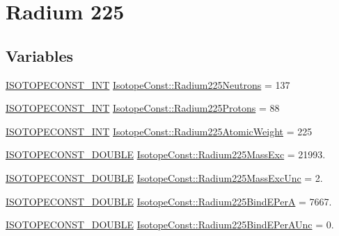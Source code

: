 \hypertarget{group___isotope_const-_radium-_ra225}{}\section{Radium 225}
\label{group___isotope_const-_radium-_ra225}
\subsection*{Variables}
\begin{DoxyCompactItemize}
\item 
\mbox{\hyperlink{group___isotope_const-_macros_ga5f18360b3e99483a35c32d789e62621c}{I\+S\+O\+T\+O\+P\+E\+C\+O\+N\+S\+T\+\_\+\+I\+NT}} \mbox{\hyperlink{group___isotope_const-_radium-_ra225_gac2692ce0cbf1dfe123369ef953519fb7}{Isotope\+Const\+::\+Radium225\+Neutrons}} = 137
\item 
\mbox{\hyperlink{group___isotope_const-_macros_ga5f18360b3e99483a35c32d789e62621c}{I\+S\+O\+T\+O\+P\+E\+C\+O\+N\+S\+T\+\_\+\+I\+NT}} \mbox{\hyperlink{group___isotope_const-_radium-_ra225_ga2947655642e26c28b35f58be93a990cc}{Isotope\+Const\+::\+Radium225\+Protons}} = 88
\item 
\mbox{\hyperlink{group___isotope_const-_macros_ga5f18360b3e99483a35c32d789e62621c}{I\+S\+O\+T\+O\+P\+E\+C\+O\+N\+S\+T\+\_\+\+I\+NT}} \mbox{\hyperlink{group___isotope_const-_radium-_ra225_gaeafa217f0c04afd10711a221abee6bfe}{Isotope\+Const\+::\+Radium225\+Atomic\+Weight}} = 225
\item 
\mbox{\hyperlink{group___isotope_const-_macros_ga8f45a7272ce02c0b4c65c44636ed719a}{I\+S\+O\+T\+O\+P\+E\+C\+O\+N\+S\+T\+\_\+\+D\+O\+U\+B\+LE}} \mbox{\hyperlink{group___isotope_const-_radium-_ra225_gaf5c7bdb0575e4c892258792d58313612}{Isotope\+Const\+::\+Radium225\+Mass\+Exc}} = 21993.
\item 
\mbox{\hyperlink{group___isotope_const-_macros_ga8f45a7272ce02c0b4c65c44636ed719a}{I\+S\+O\+T\+O\+P\+E\+C\+O\+N\+S\+T\+\_\+\+D\+O\+U\+B\+LE}} \mbox{\hyperlink{group___isotope_const-_radium-_ra225_ga9a69b87d41d8f97d6198fe211d8c5e33}{Isotope\+Const\+::\+Radium225\+Mass\+Exc\+Unc}} = 2.
\item 
\mbox{\hyperlink{group___isotope_const-_macros_ga8f45a7272ce02c0b4c65c44636ed719a}{I\+S\+O\+T\+O\+P\+E\+C\+O\+N\+S\+T\+\_\+\+D\+O\+U\+B\+LE}} \mbox{\hyperlink{group___isotope_const-_radium-_ra225_ga06400fe893b6262843ade772ebdd36cd}{Isotope\+Const\+::\+Radium225\+Bind\+E\+PerA}} = 7667.
\item 
\mbox{\hyperlink{group___isotope_const-_macros_ga8f45a7272ce02c0b4c65c44636ed719a}{I\+S\+O\+T\+O\+P\+E\+C\+O\+N\+S\+T\+\_\+\+D\+O\+U\+B\+LE}} \mbox{\hyperlink{group___isotope_const-_radium-_ra225_ga369e5c323f580bf002f479d2cc110436}{Isotope\+Const\+::\+Radium225\+Bind\+E\+Per\+A\+Unc}} = 0.

\end{DoxyCompactItemize}
